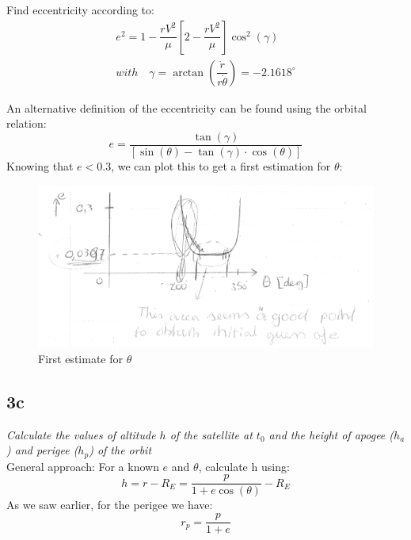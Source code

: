 Find eccentricity according to:
\begin{equation}
\begin{split}
    e^{2}=1-\dfrac {rV^{2}}{\mu }\left[ 2-\dfrac {rV^{2}}{\mu }\right] \cos ^{2}\left( \gamma \right) \\
    with \quad \gamma =\arctan \left( \dfrac {\dot{r}}{r\dot{\theta} }\right) =-2.1618^{\circ }
\end{split}
\end{equation}

An alternative definition of the eccentricity can be found using the orbital relation:
\begin{equation}
    e = \dfrac {\tan \left( \gamma \right) }{\left[ \sin \left( \theta \right) -\tan \left( \gamma \right) \cdot \cos \left( \theta \right) \right] }
\end{equation}
Knowing that $e < 0.3$, we can plot this to get a first estimation for $\theta$:
\begin{figure}[H]
    \centering
    \includegraphics[width=0.6\columnwidth]{Figures/3b.png}
    \caption{First estimate for $\theta$}
    \label{fig:theta}
\end{figure}


\subsection{3c}
\textit{Calculate the values of altitude $h$ of the satellite at $t_0$ and the height of apogee ($h_a$) and perigee ($h_p$) of the orbit} \\

General approach:
For a known $e$ and $\theta$, calculate h using:
\begin{equation}
    h = r-R_E = \frac{p}{1+e \cos(\theta)}-R_E
\end{equation}
As we saw earlier, for the perigee we have:
\begin{equation}
    r_p = \frac{p}{1+e}
\end{equation}

